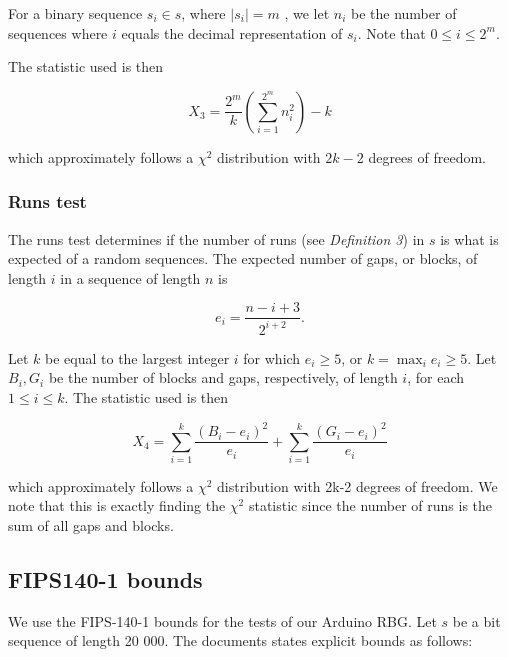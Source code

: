 \documentclass[a4paper]{article}           %
\begin{document}
For a binary sequence $s_i \in s$, where $|s_i| = m$ , we let $n_i$ be the number of sequences where $i$ equals the decimal representation of $s_i$. Note that $0 \leq i \leq 2^m$. 

The statistic used is then

\begin{equation}
X_3 = \frac{2^m}{k} \left( \sum_{i=1}^{2^m} n_i^2 \right) - k
\end{equation}

which approximately follows a $\chi^2$ distribution with $2k - 2$ degrees of freedom.
 
\subsubsection{Runs test}

The runs test determines if the number of runs (see \textit{Definition 3}) in $s$ is what is expected of a random sequences. The expected number of gaps, or blocks, of length $i$ in a sequence of length $n$ is

\[
e_i = \frac{n-i+3}{2^{i+2}}.
\]

Let $k$ be equal to the largest integer $i$ for which $e_i \geq 5$, or $k = \max_i e_i \geq 5$. Let $B_i, G_i$ be the number of blocks and gaps, respectively, of length $i$, for each $ 1 \leq i \leq k$. The statistic used is then

\begin{equation}
X_4 = \sum_{i=1}^k \frac{(B_i - e_i)^2}{e_i} + \sum_{i=1}^k \frac{(G_i - e_i)^2}{e_i}
\end{equation}

which approximately follows a $\chi^2$ distribution with 2k-2 degrees of freedom. We note that this is exactly finding the $\chi^2$ statistic since the number of runs is the sum of all gaps and blocks. 

\subsection{FIPS140-1 bounds}

We use the FIPS-140-1 bounds\cite{fips140} for the tests of our Arduino RBG. Let $s$ be a bit sequence of length 20 000. The documents states explicit bounds as follows:
\end{document}
